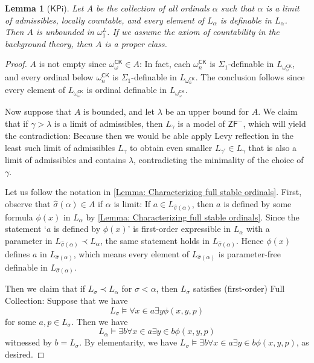 \documentclass{amsart}
\newtheorem{lemma}[theorem]{Lemma}
\theoremstyle{remark}
\newcommand{\KPi}{\mathsf{KPi}}
\begin{document}
\begin{lemma}[$\KPi$] \label{Lemma: Collection of all L-pointwise definable ordinal is cofinal}
    Let $A$ be the collection of all ordinals $\alpha$ such that $\alpha$ is a limit of admissibles, locally countable, and every element of $L_\alpha$ is definable in $L_\alpha$. Then $A$ is unbounded in $\omega_1^L$.
    If we assume the axiom of countability in the background theory, then $A$ is a proper class.
\end{lemma}
\begin{proof}
    $A$ is not empty since $\omega_\omega^\mathsf{CK}\in A$: In fact, each $\omega_n^\mathsf{CK}$ is $\Sigma_1$-definable in $L_{\omega_\omega^\mathsf{CK}}$, and every ordinal below $\omega_n^\mathsf{CK}$ is $\Sigma_1$-definable in $L_{\omega_n^\mathsf{CK}}$. The conclusion follows since every element of $L_{\omega_\omega^\mathsf{CK}}$ is ordinal definable in $L_{\omega_\omega^\mathsf{CK}}$.
    
    Now suppose that $A$ is bounded, and let $\lambda$ be an upper bound for $A$. We claim that if $\gamma>\lambda$ is a limit of admissibles, then $L_\gamma$ is a model of $\mathsf{ZF}^-$, which will yield the contradiction: Because then we would be able apply Levy reflection in the least such limit of admissibles $L_\gamma$ to obtain even smaller $L_{\gamma'}\in L_\gamma$ that is also a limit of admissibles and contains $\lambda$, contradicting the minimality of the choice of $\gamma$.

    Let us follow the notation in \autoref{Lemma: Characterizing full stable ordinals}. First, observe that $\hat{\sigma}(\alpha)\in A$ if $\alpha$ is limit: If $a\in L_{\hat{\sigma}(\alpha)}$, then $a$ is defined by some formula $\phi(x)$ in $L_\alpha$ by \autoref{Lemma: Characterizing full stable ordinals}.
    Since the statement `$a$ is defined by $\phi(x)$' is first-order expressible in $L_\alpha$ with a parameter in $L_{\hat{\sigma}(\alpha)} \prec L_\alpha$, the same statement holds in $L_{\hat{\sigma}(\alpha)}$. Hence $\phi(x)$ defines $a$ in $L_{\hat{\sigma}(\alpha)}$, which means every element of $L_{\hat{\sigma}(\alpha)}$ is parameter-free definable in $L_{\hat{\sigma}(\alpha)}$. 

    Then we claim that if $L_\sigma\prec L_\alpha$ for $\sigma<\alpha$, then $L_\sigma$ satisfies (first-order) Full Collection: Suppose that we have 
    \begin{equation*}
        L_\sigma \vDash \forall x\in a \exists y \phi(x,y,p)
    \end{equation*}
    for some $a,p\in L_\sigma$. Then we have
    \begin{equation*}
        L_\alpha \vDash \exists b \forall x\in a \exists y\in b \phi(x,y,p)
    \end{equation*}
    witnessed by $b=L_\sigma$. By elementarity, we have $L_\sigma\vDash \exists b \forall x\in a \exists y\in b \phi(x,y,p)$, as desired.


\end{proof}
\end{document}

